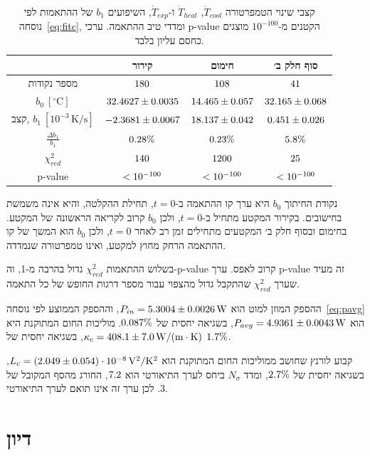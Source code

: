 \documentclass[10pt,a4paper]{article}
\newcommand{\textenglish}[1]{\foreignlanguage{english}{#1}}
\newcommand{\U}[1]{\,\mathrm{#1}}
\begin{document}
\begin{table}[H]
  \centering
  \renewcommand{\arraystretch}{1.3}
  \begin{tabular}{|c|c|c|c|}
    \hline
     & קירור & חימום & סוף חלק ב׳ \\
    \hline
    מספר נקודות & $180$ & $108$ & $41$ \\
    \hline
    $b_0\ [^\circ\mathrm{C}]$ & $32.4627 \pm 0.0035$ & $14.465 \pm 0.057$ & $32.165 \pm 0.068$ \\
    \hline
    קצב, $b_1\ [10^{-3}\,\mathrm{K/s}]$ & $-2.3681 \pm 0.0067$ & $18.137 \pm 0.042$ & $0.451 \pm 0.026$ \\
    \hline
    $\frac{\Delta b_1}{b_1}$ & $0.28\%$ & $0.23\%$ & $5.8\%$ \\
    \hline
    $\chi^2_{red}$ & $140$ & $1200$ & $25$ \\
    \hline
    \textenglish{p-value} & $< 10^{-100}$ & $< 10^{-100}$ & $< 10^{-100}$ \\
    \hline
  \end{tabular}
  \caption{קצבי שינוי הטמפרטורה $\dot{T}_{cool}$, $\dot{T}_{heat}$ ו-$\dot{T}_{exp}$, השיפועים $b_1$ של ההתאמות לפי נוסחה~\eqref{eq:fitc}, ומדדי טיב ההתאמה. ערכי \textenglish{p-value} הקטנים מ-$10^{-100}$ מוצגים כחסם עליון בלבד.}
  \label{tab:c-results}
\end{table}
נקודת החיתוך $b_0$ היא ערך קו ההתאמה ב-$t = 0$, תחילת ההקלטה, והיא אינה משמשת בחישובים. בקירור המקטע מתחיל ב-$t = 0$, ולכן $b_0$ קרוב לקריאה הראשונה של המקטע. בחימום ובסוף חלק ב׳ המקטעים מתחילים זמן רב לאחר $t = 0$, ולכן $b_0$ הוא המשך של קו ההתאמה הרחק מחוץ למקטע, ואינו טמפרטורה שנמדדה.

בשלוש ההתאמות $\chi^2_{red}$ גדול בהרבה מ-1, וה-\textenglish{p-value} קרוב לאפס. ערך \textenglish{p-value} זה מעיד שערך $\chi^2_{red}$ שהתקבל גדול מהצפוי עבור מספר דרגות החופש של כל התאמה.

ההספק המוזן למוט הוא $P_{in} = \CPin\U{W}$, וההספק הממוצע לפי נוסחה~\eqref{eq:pavg} הוא $P_{avg} = \CPavg\U{W}$, בשגיאה יחסית של $0.087\%$. מוליכות החום המתוקנת היא $\kappa_c = \CKappa\U{W/(m\cdot K)}$, בשגיאה יחסית של $1.7\%$.

קבוע לורנץ שחושב ממוליכות החום המתוקנת הוא $L_c = \CLorenz\U{V^2/K^2}$, בשגיאה יחסית של $2.7\%$, ומדד $N_\sigma$ ביחס לערך התיאורטי הוא $7.2$, החורג מהסף המקובל של 3. לכן ערך זה אינו תואם לערך התיאורטי.

\section*{דיון}
\end{document}
